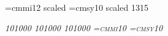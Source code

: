 \def\ssecnominalsize{13pt}
\setfont\ssecrm{}
\setfont\ssecit{}
\setfont\ssecsl{}
\setfont\ssectt{}
\setfont\ssecttsl{}
\setfont\ssecsf{}
\let\ssecbf\ssecrm
\setfont\ssecsc{}
\font\sseci=cmmi12 scaled \magstephalf
\font\ssecsy=cmsy10 scaled 1315

\def\reducednominalsize{10pt}
\setfont\reducedrm{}
\setfont\reducedtt{}
\setfont\reducedbf{}
\setfont\reducedit\itshape{10}{1000}
\setfont\reducedsl\slshape{10}{1000}
\setfont\reducedsf{}
\setfont\reducedsc\scshape{10}{1000}
\setfont\reducedttsl{}
\font\reducedi=cmmi10
\font\reducedsy=cmsy10

%
\def\resetmathfonts{%
  \textfont0=\tenrm \textfont1=\teni \textfont2=\tensy
  \textfont\itfam=\tenit \textfont\slfam=\tensl \textfont\bffam=\tenbf
  \textfont\ttfam=\tentt \textfont\sffam=\tensf
}


